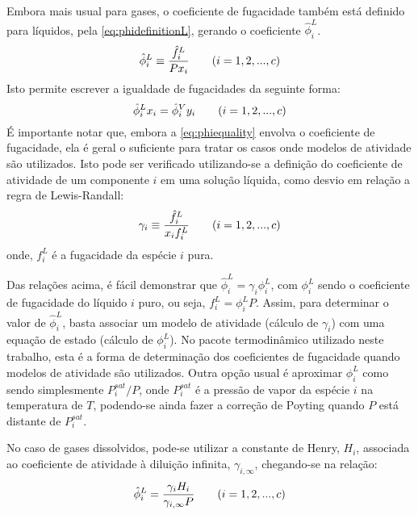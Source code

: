 Embora mais usual para gases, o coeficiente de fugacidade também
está definido para líquidos, pela \autoref{eq:phidefinitionL}, gerando o coeficiente $\hat{\phi}^L_i$.
\begin{equation}
\hat{\phi}^L_i \equiv \dfrac{\hat{f}^L_i}{Px_i} \qquad (i = 1,2,...,c) \\
\label{eq:phidefinitionL}
\end{equation}
Isto permite escrever a igualdade de fugacidades da seguinte forma:
\begin{equation}
\hat{\phi}^L_i x_i = \hat{\phi}^V_i y_i \qquad (i = 1,2,...,c) \\
\label{eq:phiequality}
\end{equation}
É importante notar que, embora a \autoref{eq:phiequality} envolva o
coeficiente de fugacidade, ela é geral o suficiente para tratar os casos onde
modelos de atividade são utilizados.
Isto pode ser verificado utilizando-se a definição do coeficiente de atividade
de um componente $i$ em uma solução líquida, como desvio em relação a regra de Lewis-Randall:
\begin{equation}
\gamma_i \equiv \dfrac{\hat{f}^L_i}{x_if^L_i} \qquad (i = 1,2,...,c) \\
\label{eq:gammadefinition}
\end{equation}
onde, $f^L_i$ é a fugacidade da espécie $i$ pura.

Das relações acima, é fácil demonstrar que $\hat{\phi}^L_i = \gamma_i \phi^L_i$,
com $\phi^L_i$ sendo o coeficiente de fugacidade do líquido $i$ puro, ou seja, $f^L_i = \phi^L_i P$. Assim,
para determinar o valor de $\hat{\phi}^L_i$,
basta associar um modelo de atividade (cálculo de $\gamma_i$) com uma equação de
estado (cálculo de $\phi^L_i$).
No pacote termodinâmico utilizado neste trabalho, esta é a forma de determinação
dos coeficientes de fugacidade quando modelos de atividade são utilizados.
Outra opção usual é aproximar $\phi^L_i$ como sendo simplesmente $P^{sat}_i/P$, onde
$P^{sat}_i$ é a pressão de vapor da espécie $i$ na temperatura de $T$, podendo-se ainda
fazer a correção de Poyting quando $P$ está distante de $P^{sat}_i$.

No caso de gases dissolvidos, pode-se utilizar a constante de Henry, $H_i$, associada ao coeficiente de
atividade à diluição infinita, $\gamma_{i,\infty}$, chegando-se na relação:
\begin{equation}
\hat{\phi}^L_i = \dfrac{\gamma_i H_i}{\gamma_{i,\infty} P} \qquad (i = 1,2,...,c) \\
\label{eq:gammadefinitionHenry}
\end{equation}

